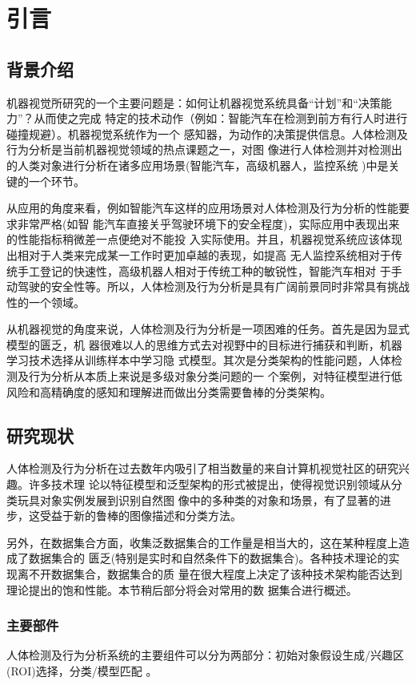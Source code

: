 \chapter{引言}
\section{背景介绍}
机器视觉所研究的一个主要问题是：如何让机器视觉系统具备“计划”和“决策能力”？从而使之完成
特定的技术动作（例如：智能汽车在检测到前方有行人时进行碰撞规避）。机器视觉系统作为一个
感知器，为动作的决策提供信息。人体检测及行为分析是当前机器视觉领域的热点课题之一，对图
像进行人体检测并对检测出的人类对象进行分析在诸多应用场景(智能汽车，高级机器人，监控系统
)中是关键的一个环节。

从应用的角度来看，例如智能汽车这样的应用场景对人体检测及行为分析的性能要求非常严格(如智
能汽车直接关乎驾驶环境下的安全程度)，实际应用中表现出来的性能指标稍微差一点便绝对不能投
入实际使用。并且，机器视觉系统应该体现出相对于人类来完成某一工作时更加卓越的表现，如提高
无人监控系统相对于传统手工登记的快速性，高级机器人相对于传统工种的敏锐性，智能汽车相对
于手动驾驶的安全性等。所以，人体检测及行为分析是具有广阔前景同时非常具有挑战性的一个领域。

从机器视觉的角度来说，人体检测及行为分析是一项困难的任务。首先是因为显式模型的匮乏，机
器很难以人的思维方式去对视野中的目标进行捕获和判断，机器学习技术选择从训练样本中学习隐
式模型。其次是分类架构的性能问题，人体检测及行为分析从本质上来说是多级对象分类问题的一
个案例，对特征模型进行低风险和高精确度的感知和理解进而做出分类需要鲁棒的分类架构。

\section{研究现状}
人体检测及行为分析在过去数年内吸引了相当数量的来自计算机视觉社区的研究兴趣。许多技术理
论以特征模型和泛型架构的形式被提出，使得视觉识别领域从分类玩具对象实例发展到识别自然图
像中的多种类的对象和场景，有了显著的进步，这受益于新的鲁棒的图像描述和分类方法。

另外，在数据集合方面，收集泛数据集合的工作量是相当大的，这在某种程度上造成了数据集合的
匮乏(特别是实时和自然条件下的数据集合)。各种技术理论的实现离不开数据集合，数据集合的质
量在很大程度上决定了该种技术架构能否达到理论提出的饱和性能。本节稍后部分将会对常用的数
据集合进行概述。

\subsection{主要部件}
人体检测及行为分析系统的主要组件可以分为两部分：初始对象假设生成/兴趣区(ROI)选择，分类/模型匹配
。
